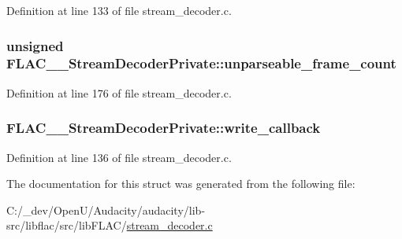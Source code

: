 Definition at line 133 of file stream\+\_\+decoder.\+c.

\subsubsection[{\texorpdfstring{unparseable\+\_\+frame\+\_\+count}{unparseable_frame_count}}]{\setlength{\rightskip}{0pt plus 5cm}unsigned F\+L\+A\+C\+\_\+\+\_\+\+Stream\+Decoder\+Private\+::unparseable\+\_\+frame\+\_\+count}\hypertarget{struct_f_l_a_c_____stream_decoder_private_a7172ce0d384892d08810cf73852567a4}{}\label{struct_f_l_a_c_____stream_decoder_private_a7172ce0d384892d08810cf73852567a4}


Definition at line 176 of file stream\+\_\+decoder.\+c.

\subsubsection[{\texorpdfstring{write\+\_\+callback}{write_callback}}]{ F\+L\+A\+C\+\_\+\+\_\+\+Stream\+Decoder\+Private\+::write\+\_\+callback}\hypertarget{struct_f_l_a_c_____stream_decoder_private_ae2c2b48a59583f6b5ebcc86fac9066c6}{}\label{struct_f_l_a_c_____stream_decoder_private_ae2c2b48a59583f6b5ebcc86fac9066c6}


Definition at line 136 of file stream\+\_\+decoder.\+c.



The documentation for this struct was generated from the following file\+:\begin{DoxyCompactItemize}
\item 
C\+:/\+\_\+dev/\+Open\+U/\+Audacity/audacity/lib-\/src/libflac/src/lib\+F\+L\+A\+C/\hyperlink{stream__decoder_8c}{stream\+\_\+decoder.\+c}\end{DoxyCompactItemize}
